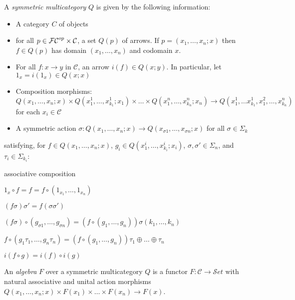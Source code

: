 \documentclass{report}
\newenvironment{renumerate}
{\begin{list}{\roman{enumi}.}
    {\itemsep=0in\usecounter{enumi}}
  }{\end{list}}
\newcommand{\Set}{\text{$\mathcal{S}\!et$}}
\renewcommand{\C}{\text{$\mathcal{C}$}}
\begin{document}
\begin{defn}
  A {\em symmetric multicategory} \cite{cheng_weak_2002} $Q$ is given by the following information:
  \begin{itemize}\itemsep-4pt
  \item A category $C$ of objects
  \item for all $p\in\F\C^{op}\times \C$, a set $Q(p)$ of arrows. If $p = (x_1,\ldots, x_n;x)$ then $f\in Q(p)$ has domain $(x_1,\ldots, x_n)$ and codomain $x$.
  \item For all $f: x\to y$ in $\C$, an arrow $i(f)\in Q(x;y)$. In particular, let $1_x = i(1_x)\in Q(x;x)$
  \item Composition morphisms: $Q(x_1,\ldots, x_n;x)\times Q(x_1^1,\ldots, x_{k_1}^1; x_1)\times\ldots\times Q(x_1^n,\ldots,x_{k_n}^n;x_n) \to Q(x_1^1,\ldots x_{k_1}^1,x_1^2,\ldots, x_{k_n}^n)$ for each $x_i\in \C$
  \item A symmetric action $\sigma: Q(x_1,\ldots, x_n;x)\to Q(x_{\sigma 1}, \ldots, x_{\sigma n};x)$ for all $\sigma\in\Sigma_k$
  \end{itemize}
satisfying, for  $f\in Q(x_1,\ldots, x_n;x)$, $g_i\in Q(x_1^i,\ldots, x_{k_i}^i;x_i)$, $\sigma,\sigma'\in\Sigma_n$, and $\tau_i\in \Sigma_{k_i}$:
\begin{renumerate}\itemsep-4pt
\item associative composition
\item $1_x\circ f = f = f\circ (1_{x_1}, \ldots, 1_{x_n})$
\item $(f\sigma)\sigma' = f(\sigma\sigma')$
\item $(f\sigma)\circ (g_{\sigma 1},\ldots,g_{\sigma n})=(f\circ (g_1,\ldots, g_n))\sigma(k_1,\ldots, k_n)$
\item $f\circ (g_1\tau_1,\ldots, g_n\tau_n) = (f\circ (g_1,\ldots, g_n))\tau_1\oplus\ldots\oplus\tau_n$
\item $i(f\circ g) = i(f)\circ i(g)$
\end{renumerate}
\end{defn}
\begin{defn}
  An {\em algebra} $F$ over a symmetric multicategory $Q$ is a functor $F: \C\to \Set$ with natural associative and unital action morphisms $Q(x_1,\ldots, x_n; x)\times F(x_1)\times\ldots\times F(x_n)\to F(x)$.
\end{defn}
\end{document}
